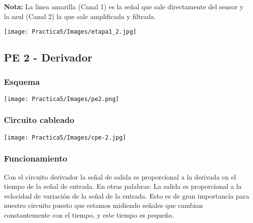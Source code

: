 \documentclass[12pt]{article}
\begin{document}
            \textbf{Nota:} La linea amarilla (Canal 1) es la señal que sale directamente del sensor y la azul (Canal 2) la que sale amplificada y filtrada.
         
            \begin{center}
            \texttt{[image: Practica5/Images/etapa1\_2.jpg]}
            \end{center}
              
        \subsection{PE 2 - Derivador}
        \begin{multicols}{2}
            \subsubsection{Esquema}

                \texttt{[image: Practica5/Images/pe2.png]}

        \columnbreak
            \subsubsection{Circuito cableado}

                \texttt{[image: Practica5/Images/cpe-2.jpg]}

            \end{multicols}
            
        \subsubsection{Funcionamiento}
        
        Con el circuito derivador la señal de salida es proporcional a la derivada en el tiempo de la señal de entrada. En otras palabras: La salida es proporcional a la velocidad de variación de la señal de la entrada. Esto es de gran importancia para nuestro circuito puesto que estamos midiendo señales que cambian constantemente con el tiempo, y este tiempo es pequeño.
\end{document}
